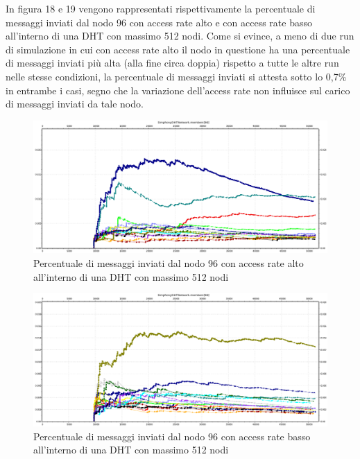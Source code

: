 \documentclass[	
	DIV=calc,
	paper=a4,
	fontsize=11pt,
	onecolumn
]{scrartcl} %
\begin{document}
	In figura 18 e 19 vengono rappresentati rispettivamente la percentuale di messaggi inviati dal nodo 96 con access rate alto e con access rate basso all'interno di una DHT con massimo 512 nodi. Come si evince, a meno di due run di simulazione in cui con access rate alto il nodo in questione ha una percentuale di messaggi inviati più alta (alla fine circa doppia) rispetto a tutte le altre run nelle stesse condizioni, la percentuale di messaggi inviati si attesta sotto lo 0,7\% in entrambe i casi, segno che la variazione dell'access rate non influisce sul carico di messaggi inviati da tale nodo.
	
	\begin{figure}[H]
		\centering
		\includegraphics[scale=0.35]	{SymphonyDHT/plots/PercentageOfMessagesSent/512_Nodes_FastAccess/SymphonyDHT_512Nodes_FastAccess_Node96.png}
		\caption{Percentuale di messaggi inviati dal nodo 96 con access rate alto all'interno di una DHT con massimo 512 nodi}
		\label{Figura 18}
	\end{figure}
	\begin{figure}[H]
		\centering
		\includegraphics[scale=0.35]	{SymphonyDHT/plots/PercentageOfMessagesSent/512_Nodes_SlowAccess/SymphonyDHT_512Nodes_SlowAccess_Node96.png}
		\caption{Percentuale di messaggi inviati dal nodo 96 con access rate basso all'interno di una DHT con massimo 512 nodi}
		\label{Figura 19}
	\end{figure}		
	
\end{document}
